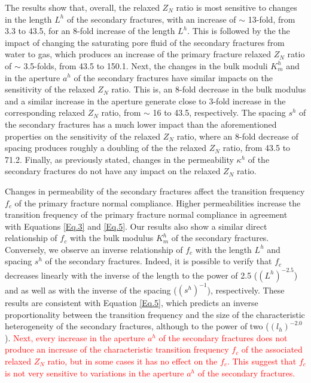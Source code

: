 \documentclass[draft]{agujournal2019}
\newcommand{\red}{\textcolor{red}}
\begin{document}
The results show that, overall, the relaxed $Z_N$ ratio is  most sensitive to changes in the length $L^h$ of the secondary fractures, with an increase of $\sim$ 13-fold, from  3.3 to 43.5, for an 8-fold increase of the length $L^h$.  This is followed by the the impact of changing the saturating pore fluid of the secondary fractures from water to gas, which produces an increase of the primary fracture relaxed $Z_N$ ratio of $\sim$ 3.5-folds, from 43.5 to 150.1.
Next, the changes in the bulk moduli $K_m^h$  and  in the aperture $a^h$  of the secondary fractures have similar impacts on the sensitivity of the relaxed  $Z_N$ ratio. This is, an 8-fold decrease in the bulk modulus and a similar increase in the aperture generate close to 3-fold increase in the corresponding relaxed $Z_N$ ratio, from $\sim$ 16 to 43.5,  respectively. 
The spacing $s^h$ of the secondary fractures has a much lower impact than the aforementioned properties on the sensitivity of the relaxed $Z_N$ ratio, where an 8-fold decrease of spacing  produces roughly a doubling of the the relaxed $Z_N$ ratio, from 43.5 to 71.2. 
Finally, as previously stated, changes in  the permeability $\kappa^h$ of the secondary fractures do not have any impact on the relaxed $Z_N$ ratio.

Changes in permeability of the secondary fractures affect the transition frequency $f_c$ of the primary fracture normal compliance. Higher permeabilities increase the transition frequency of the primary fracture normal compliance  in agreement with Equations \ref{Eq.3} and \ref{Eq.5}. Our results also show  a similar direct relationship of $f_c$ with the bulk modulus $K_m^h$ of the secondary fractures.
Conversely, we observe an inverse relationship of $f_c$  with the length $L^h$  and spacing $s^h$ of the secondary fractures. Indeed, it is possible to verify that $f_c$ decreases linearly with the inverse of the length to the power of 2.5 ($(L^h)^{-2.5}$) and as well as with the inverse of the spacing ($(s^h)^{-1}$), respectively. 
These results are consistent with Equation \ref{Eq.5}, which predicts an inverse proportionality between the transition frequency and the size of the characteristic heterogeneity of the secondary fractures, although to the power of two  ($(l_h)^{-2.0}$).  
\red{Next, every increase in the aperture $a^h$ of the secondary fractures does not produce an increase of the characteristic transition frequency $f_c$ of the associated relaxed $Z_N$ ratio, but in some cases it has no effect on the $f_c$. This suggest that $f_c$ is not very sensitive to variations in the aperture $a^h$ of the secondary fractures.
} 
\end{document}
